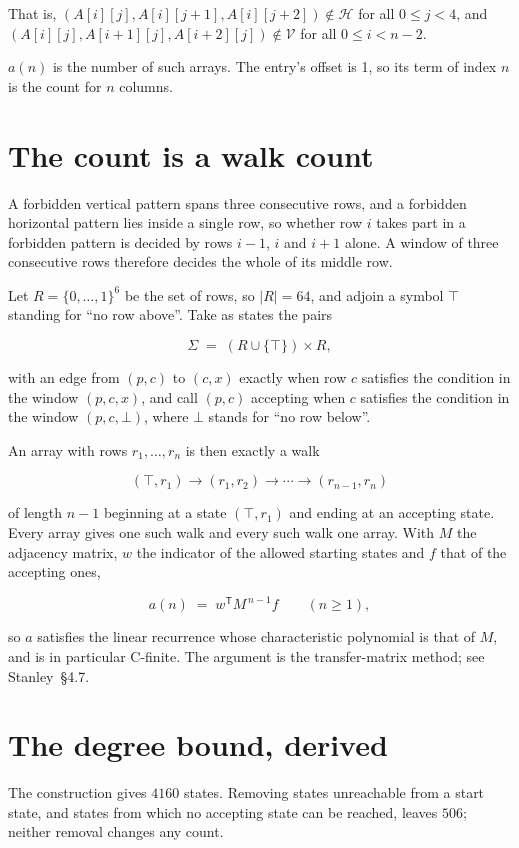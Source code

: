 \documentclass[11pt]{article}
\theoremstyle{definition}
\begin{document}
That is, $(A[i][j],A[i][j{+}1],A[i][j{+}2]) \notin \mathcal{H}$ for all $0 \le j < 4$, and $(A[i][j],A[i{+}1][j],A[i{+}2][j]) \notin \mathcal{V}$ for all $0 \le i < n-2$.

$a(n)$ is the number of such arrays. The entry's offset is 1, so its term of index $n$ is the count for $n$ columns.

\section{The count is a walk count}

A forbidden vertical pattern spans three consecutive rows, and a forbidden horizontal pattern lies inside a single row, so whether row $i$ takes part in a forbidden pattern is decided by rows $i-1$, $i$ and $i+1$ alone. A window of three consecutive rows therefore decides the whole of its middle row.

Let $R = \{0,\dots,1\}^{6}$ be the set of rows, so $|R| = 64$, and adjoin a symbol $\top$ standing for ``no row above''. Take as states the pairs

\[\Sigma \;=\; (R \cup \{\top\}) \times R,\]

with an edge from $(p,c)$ to $(c,x)$ exactly when row $c$ satisfies the condition in the window $(p,c,x)$, and call $(p,c)$ accepting when $c$ satisfies the condition in the window $(p,c,\bot)$, where $\bot$ stands for ``no row below''.

An array with rows $r_1,\dots,r_n$ is then exactly a walk

\[(\top,r_1) \to (r_1,r_2) \to \cdots \to (r_{n-1},r_n)\]

of length $n-1$ beginning at a state $(\top,r_1)$ and ending at an accepting state. Every array gives one such walk and every such walk one array. With $M$ the adjacency matrix, $w$ the indicator of the allowed starting states and $f$ that of the accepting ones,

\[a(n) \;=\; w^{\mathsf T} M^{\,n-1} f \qquad (n \ge 1),\]

so $a$ satisfies the linear recurrence whose characteristic polynomial is that of $M$, and is in particular C-finite. The argument is the transfer-matrix method; see Stanley~\S4.7.

\section{The degree bound, derived}

The construction gives $4160$ states. Removing states unreachable from a start state, and states from which no accepting state can be reached, leaves $506$; neither removal changes any count.
\end{document}
